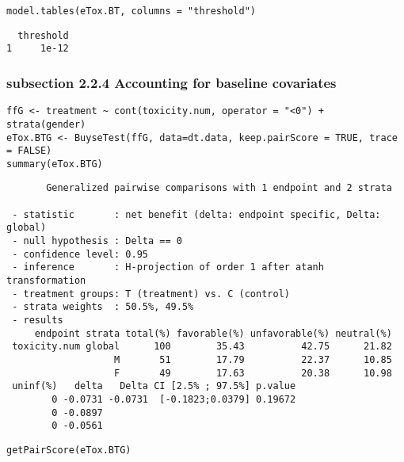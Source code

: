 \documentclass[12pt]{article}
\begin{document}
\lstset{language=r,label= ,caption= ,captionpos=b,numbers=none}
\begin{lstlisting}
model.tables(eTox.BT, columns = "threshold")
\end{lstlisting}

\begin{verbatim}
  threshold
1     1e-12
\end{verbatim}

\subsubsection{subsection 2.2.4 Accounting for baseline covariates}
\label{sec:org818b4d6}

\lstset{language=r,label= ,caption= ,captionpos=b,numbers=none}
\begin{lstlisting}
ffG <- treatment ~ cont(toxicity.num, operator = "<0") + strata(gender)
eTox.BTG <- BuyseTest(ffG, data=dt.data, keep.pairScore = TRUE, trace = FALSE)
summary(eTox.BTG)
\end{lstlisting}

\begin{verbatim}
       Generalized pairwise comparisons with 1 endpoint and 2 strata

 - statistic       : net benefit (delta: endpoint specific, Delta: global) 
 - null hypothesis : Delta == 0 
 - confidence level: 0.95 
 - inference       : H-projection of order 1 after atanh transformation 
 - treatment groups: T (treatment) vs. C (control) 
 - strata weights  : 50.5%, 49.5% 
 - results
     endpoint strata total(%) favorable(%) unfavorable(%) neutral(%)
 toxicity.num global      100        35.43          42.75      21.82
                   M       51        17.79          22.37      10.85
                   F       49        17.63          20.38      10.98
 uninf(%)   delta   Delta CI [2.5% ; 97.5%] p.value 
        0 -0.0731 -0.0731  [-0.1823;0.0379] 0.19672 
        0 -0.0897                                   
        0 -0.0561
\end{verbatim}

\lstset{language=r,label= ,caption= ,captionpos=b,numbers=none}
\begin{lstlisting}
getPairScore(eTox.BTG)
\end{lstlisting}
\end{document}
